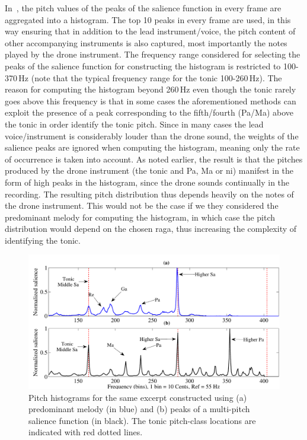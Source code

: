 In~\cite{salamon2012multipitch,gulati2012two}, the pitch values of the peaks of the salience function in every frame are aggregated into a histogram. The top 10 peaks in every frame are used, in this way ensuring that in addition to the lead instrument/voice, the pitch content of other accompanying instruments is also captured, most importantly the notes played by the drone instrument. The frequency range considered for selecting the peaks of the salience function for constructing the histogram is restricted to 100-370\,Hz (note that the typical frequency range for the tonic 100-260\,Hz). The reason for computing the histogram beyond 260\,Hz even though the tonic rarely goes above this frequency is that in some cases the aforementioned methods can exploit the presence of a peak corresponding to the fifth/fourth (Pa/Ma) above the tonic in order identify the tonic pitch. Since in many cases the lead voice/instrument is considerably louder than the drone sound, the weights of the salience peaks are ignored when computing the histogram, meaning only the rate of occurrence is taken into account. As noted earlier, the result is that the pitches produced by the drone instrument (the tonic and Pa, Ma or \gls{ni}) manifest in the form of high peaks in the histogram, since the drone sounds continually in the recording. The resulting pitch distribution thus depends heavily on the notes of the drone instrument. This would not be the case if we they considered the predominant melody for computing the histogram, in which case the pitch distribution would depend on the chosen \gls{raga}, thus increasing the complexity of identifying the tonic.

\begin{figure}
	\begin{center}
		\includegraphics[width=\figSizeHundred]{ch02_background/figures/Histogram_Melody_Multipitch.pdf}
	\end{center}
	\caption[Comparison of the pitch histograms constructed using two different methods]{Pitch histograms for the same excerpt constructed using (a) predominant melody (in blue) and (b) peaks of a multi-pitch salience function (in black). The tonic pitch-class locations are indicated with red dotted lines.}
	\label{fig:background_pitch_histograms_multipitch}
\end{figure}

